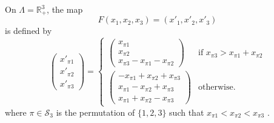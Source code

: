 On $\Lambda=\mathbb{R}^3_+$, the map
\[
F (x_1,x_2,x_3) = (x'_1,x'_2,x'_3)
\]
is defined by
\[
\left(\begin{array}{r}
	x'_{\pi 1} \\
	x'_{\pi 2} \\
	x'_{\pi 3}
\end{array}\right) =
\begin{cases}
\left(\begin{array}{l}
    x_{\pi 1}\\
    x_{\pi 2}\\
    x_{\pi 3}-x_{\pi 1}-x_{\pi 2}
\end{array}\right)
    &\mbox{if } x_{\pi 3}>x_{\pi 1}+x_{\pi 2}\\
\left(\begin{array}{r}
     -x_{\pi 1}+x_{\pi 2}+x_{\pi 3}\\
      x_{\pi 1}-x_{\pi 2}+x_{\pi 3}\\
      x_{\pi 1}+x_{\pi 2}-x_{\pi 3}
\end{array}\right)
     &\mbox{otherwise.}
\end{cases}
\]
where $\pi\in\mathcal{S}_3$ is the permutation of $\{1,2,3\}$ such that
$x_{\pi 1}<x_{\pi 2}<x_{\pi 3}$
\cite{arnoux_symmetric_2015}.
